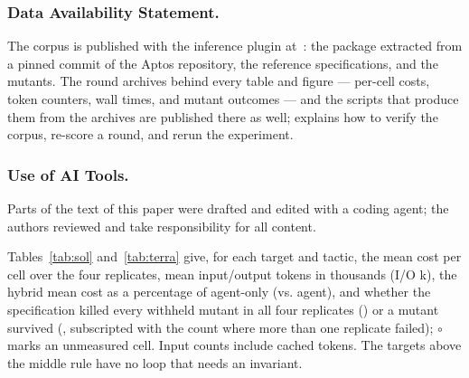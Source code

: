 






\subsubsection*{Data Availability Statement.}
The corpus is published with the inference plugin at~: the package extracted from a pinned commit of the Aptos repository, the reference specifications, and the mutants.
The round archives behind every table and figure --- per-cell costs, token counters, wall times, and mutant outcomes --- and the scripts that produce them from the archives are published there as well;  explains how to verify the corpus, re-score a round, and rerun the experiment.

\subsubsection*{Use of AI Tools.}
Parts of the text of this paper were drafted and edited with a coding agent; the authors reviewed and take responsibility for all content.



\appendix
{}
\label{sec:appendix}

Tables~\ref{tab:sol} and~\ref{tab:terra} give, for each target and tactic, the mean cost per cell over the four replicates, mean input/output tokens in thousands (I/O k), the hybrid mean cost as a percentage of agent-only (vs. agent), and whether the specification killed every withheld mutant in all four replicates (\Checkmark) or a mutant survived (\XSolidBrush, subscripted with the count where more than one replicate failed); $\circ$ marks an unmeasured cell.
Input counts include cached tokens.
The targets above the middle rule have no loop that needs an invariant.

\begin{table}
\centering
\caption{Sol~5.6 by target. Summed over the 26 targets, the tactics cost \$36.72, \$31.67, and \$31.81.}
\label{tab:sol}
\scriptsize
\setlength{\tabcolsep}{2.2pt}

\end{table}

\begin{table}
\centering
\caption{Terra~5.6 by target. Summed over the 26 targets, the tactics cost \$21.05, \$16.71, and \$18.79.}
\label{tab:terra}
\scriptsize
\setlength{\tabcolsep}{2.2pt}

\end{table}


